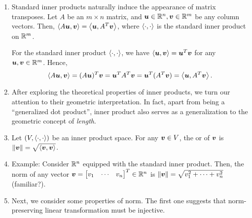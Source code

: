 \begin{enumerate}
\begin{itemize}
\begin{pf}
(4): When \(\vect{v}\ne\vect{0}\), since \(T\) is injective, we must have
\(T(\vect{v})\ne\vect{0}=T(\vect{0})\). Hence,
\[
\inner{\vect{v}}{\vect{v}}_{V}=\inner{T(\vect{v})}{T(\vect{v})}_{W}
>0.
\]
\end{pf}

\begin{note}
The injectivity of \(T\) is only needed for proving (4).
\end{note}
\end{itemize}

\item \label{it:std-inner-prod-matx-trans}
Standard inner products naturally induce the appearance of matrix transposes.
Let \(A\) be an \(m\times n\) matrix, and \(\vb*{u}\in\mathbb{R}^n,\vb*{v}\in\mathbb{R}^m\)
be any column vectors. Then,
\(\left\langle A\vb*{u},\vb*{v}\right\rangle=\left\langle \vb*{u},A^{T}\vb*{v}\right\rangle\), where
\(\left\langle \cdot,\cdot\right\rangle\) is the standard inner product on \(\mathbb{R}^m\).

\begin{pf}
For the standard inner product \(\left\langle \cdot,\cdot\right\rangle\), we have
\(\left\langle \vb*{u},\vb*{v}\right\rangle=\vb*{u}^{T}\vb*{v}\) for any
\(\vb*{u},\vb*{v}\in\mathbb{R}^m\). Hence,
\[
\left\langle A\vb*{u},\vb*{v}\right\rangle
=(A\vb*{u})^{T}\vb*{v}
=\vb*{u}^{T}A^{T}\vb*{v}
=\vb*{u}^{T}(A^{T}\vb*{v})
=\left\langle \vb*{u},A^{T}\vb*{v}\right\rangle.
\]
\end{pf}

\item After exploring the theoretical properties of inner products, we turn our
attention to their geometric interpretation. In fact, apart from being a
``generalized dot product'', inner product also serves as a generalization to
the geometric concept of \emph{length}.

\item Let \((V,\left\langle \cdot,\cdot\right\rangle)\) be an inner product space. For
any \(\vb*{v}\in V\), the  or  of \(\vb*{v}\) is
\(\norm{\vb*{v}}=\sqrt{\left\langle \vb*{v},\vb*{v}\right\rangle}\).

\item Example: Consider \(\mathbb{R}^n\) equipped with the standard inner product.
Then, the norm of any vector \(\vect{v}=\mqty[v_1&\cdots&v_n]^{T}\in\R^n\) is
\(\norm{\vb*{v}}=\sqrt{v_1^2+\dotsb+v_n^2}\) (familiar?).

\item Next, we consider some properties of norm. The first one suggests that
norm-preserving linear transformation must be injective.


\end{enumerate}
